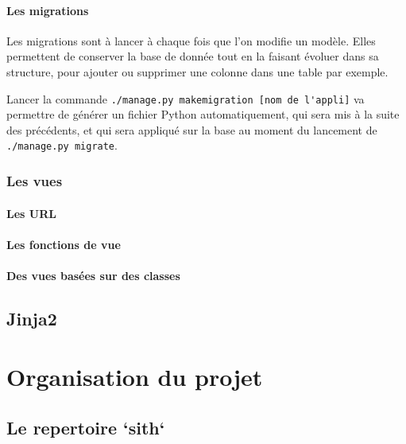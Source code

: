\documentclass[a4paper]{report}
\begin{document}
\subsubsection{Les migrations}
\label{ssub:Les migrations}
\par Les migrations sont à lancer à chaque fois que l'on modifie un modèle. Elles permettent de conserver la base de
donnée tout en la faisant évoluer dans sa structure, pour ajouter ou supprimer une colonne dans une table par exemple.
\par Lancer la commande \verb#./manage.py makemigration [nom de l'appli]# va permettre de générer un fichier Python
automatiquement, qui sera mis à la suite des précédents, et qui sera appliqué sur la base au moment du lancement de
\verb#./manage.py migrate#.

\subsection{Les vues}
\label{sub:les_vues}

\subsubsection{Les URL}
\label{ssub:Les URL}

\subsubsection{Les fonctions de vue}
\label{ssub:Les fonctions de vue}

\subsubsection{Des vues basées sur des classes}
\label{ssub:Des vues basées sur des classes}

\section{Jinja2}
\label{sec:jinja2}



\chapter{Organisation du projet}
\label{cha:organisation_du_projet}

\section{Le repertoire `sith`}
\label{sec:le_repertoire_sith}
\end{document}
